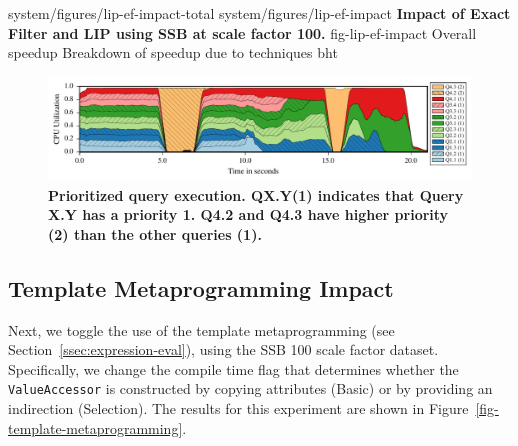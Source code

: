 
\twoabfigures
{system/figures/lip-ef-impact-total}
{system/figures/lip-ef-impact}
{\textbf{Impact of Exact Filter and LIP using SSB at scale factor 100.}}
{fig-lip-ef-impact}
{Overall speedup}
{Breakdown of speedup due to techniques}
{bht}

\begin{figure}[htb]
   \vspace*{3em}
  \centering
   \includegraphics[width=\textwidth]{system/figures/2-high-priority-queries.pdf}
   \caption{\textbf{Prioritized query execution. QX.Y(1) indicates that Query X.Y has a priority 1. Q4.2 and Q4.3 have higher priority (2) than the other queries (1).}}
   \label{fig-high-priority}
\end{figure}

\subsection{Template Metaprogramming Impact}
\label{sec:expt:vectorization}

Next, we toggle the use of the template metaprogramming (see Section~\ref{ssec:expression-eval}), using the SSB 100 scale factor dataset. Specifically, we change the compile time flag that determines whether the \texttt{ValueAccessor} is constructed by copying attributes (Basic) or by providing an indirection (Selection). The results for this experiment are shown in Figure~\ref{fig-template-metaprogramming}.

